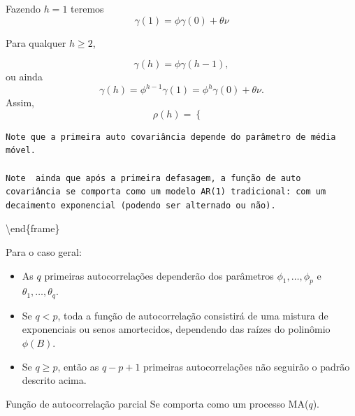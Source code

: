 \documentclass[
  letterpaper,
  DIV=11,
  numbers=noendperiod]{scrartcl}
\theoremstyle{plain}
\theoremstyle{plain}
\theoremstyle{definition}
\theoremstyle{definition}
\theoremstyle{remark}
\begin{document}
Fazendo \(h=1\) teremos \[\gamma(1)=\phi\gamma(0)+\theta\nu\]

Para qualquer \(h\geq 2\),

\[\gamma(h)=\phi\gamma(h-1),\] ou ainda
\[\gamma(h)=\phi^{h-1}\gamma(1)=\phi^h\gamma(0)+\theta\nu.\] Assim,
\[\rho(h)=\left\{\begin{array}{ll}\end{array}\right.\]

\begin{verbatim}
Note que a primeira auto covariância depende do parâmetro de média móvel.

Note  ainda que após a primeira defasagem, a função de auto covariância se comporta como um modelo AR(1) tradicional: com um decaimento exponencial (podendo ser alternado ou não).
\end{verbatim}

\textbackslash end\{frame\}

\begin{frame}
    Para o caso geral:
    \begin{itemize}
        \item As $q$ primeiras autocorrelações dependerão dos parâmetros $\phi_1,\ldots,\phi_p$ e $\theta_1,\ldots,\theta_q$.
        \item Se $q<p$, toda a função de autocorrelação consistirá de uma mistura de exponenciais ou senos amortecidos, dependendo das raízes do polinômio $\phi(B)$.
        \item Se $q\geq p$, então as $q-p+1$ primeiras autocorrelações não seguirão o padrão descrito acima.
    \end{itemize}
\end{frame}

\begin{frame}{Função de autocorrelação parcial}
    Se comporta como um processo MA($q$).
\end{frame}
\end{document}
